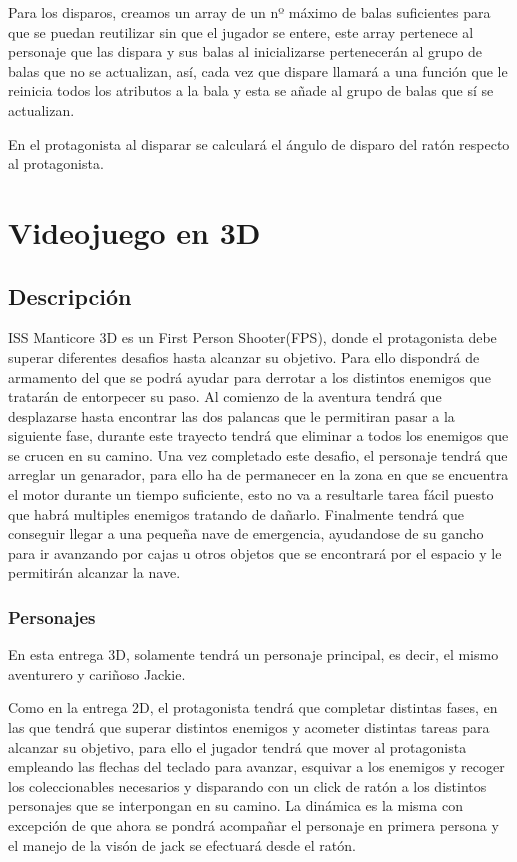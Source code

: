 Para los disparos, creamos un array de un nº máximo de balas suficientes para que se puedan reutilizar sin que el jugador se entere, este array pertenece al personaje que las dispara y sus balas al inicializarse pertenecerán al grupo de balas que no se actualizan, así, cada vez que dispare llamará a una función que le reinicia todos los atributos a la bala y esta se añade al grupo de balas que sí se actualizan. 

En el protagonista al disparar se calculará el ángulo de disparo del ratón respecto al protagonista. 

\section{Videojuego en 3D}

\subsection{Descripción}
ISS Manticore 3D es un First Person Shooter(FPS), donde el protagonista debe superar diferentes desafios hasta alcanzar su objetivo. Para ello dispondrá de armamento del que se podrá ayudar para derrotar a los distintos enemigos que tratarán de entorpecer su paso. Al comienzo de la aventura tendrá que desplazarse hasta encontrar las dos palancas que le permitiran pasar a la siguiente fase, durante este trayecto tendrá que eliminar a todos los enemigos que se crucen en su camino. Una vez completado este desafio, el personaje tendrá que arreglar un genarador, para ello ha de permanecer en la zona en que se encuentra el motor durante un tiempo suficiente, esto no va a resultarle tarea fácil puesto que habrá multiples enemigos tratando de dañarlo. Finalmente tendrá que conseguir llegar a una pequeña nave de emergencia, ayudandose de su gancho para ir avanzando por cajas u otros objetos que se encontrará por el espacio y le permitirán alcanzar la nave. 

\subsubsection{Personajes}

En esta entrega 3D, solamente tendrá un personaje principal, es decir, el mismo aventurero y cariñoso Jackie.

Como en la entrega 2D, el protagonista tendrá que completar distintas fases, en las que tendrá que superar distintos enemigos y acometer distintas tareas para alcanzar su objetivo, para ello el jugador tendrá que mover al protagonista empleando las flechas del teclado para avanzar, esquivar a los enemigos y recoger los coleccionables necesarios y disparando con un click de ratón a los distintos personajes que se interpongan en su camino. La dinámica es la misma con excepción de que ahora se pondrá acompañar el personaje en primera persona y el manejo de la visón de jack se efectuará desde el ratón.

